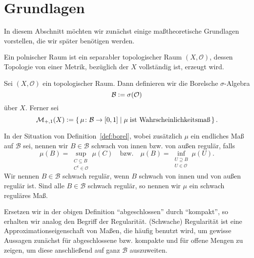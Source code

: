 \documentclass[../main/main.tex]{subfiles}
\begin{document}
	
	\section{Grundlagen}
	\label{Grundlagen}
	
	In diesem Abschnitt möchten wir zunächst einige maßtheoretische Grundlagen vorstellen, 
	die wir später benötigen werden.

	\begin{Definition}
		Ein polnischer Raum ist ein separabler topologischer Raum $(X, \mathcal{O})$, 
		dessen Topologie von einer Metrik, bezüglich der $X$ vollständig ist, erzeugt wird.
	\end{Definition}

	\begin{Definition}
		\label{def:borel}
		Sei $(X, \mathcal{O})$ ein topologischer Raum. Dann definieren wir die Borelsche 
		$\sigma$-Algebra
		$$\mathcal{B} \vcentcolon = \sigma(\mathcal{O})$$
		über $X$. Ferner sei
		$$\mathcal{M}_{+,1}(X) \vcentcolon = \left\{\, \mu \colon \mathcal{B} \to [0,1] \; | \; \mu \; 
			\text{ist Wahrscheinlichkeitsmaß} \,\right\}\text{.}$$
	\end{Definition}

	\begin{Definition}
		\label{def:regularity}
		In der Situation von Definition~\ref{def:borel}, wobei zusätzlich $\mu$ ein 
		endliches Maß auf $\mathcal{B}$ sei, nennen wir $B \in \mathcal{B}$ schwach von 
		innen bzw. von außen regulär, falls
		$$\mu(B) = \sup_{\substack{C \subseteq B \\ C^\mathsf{c} \in \mathcal{O}}} \mu(C) 
		\quad \text{bzw.} \quad \mu(B) = \inf_{\substack{U \supseteq B \\ U \in \mathcal{O}}} 
		\mu(U)\text{.}$$
		Wir nennen $B \in \mathcal{B}$ schwach regulär, wenn $B$ schwach von innen und 
		von außen regulär ist. Sind alle $B \in \mathcal{B}$ schwach regulär, 
		so nennen wir $\mu$ ein schwach reguläres Maß.
	\end{Definition}

	\begin{Bemerkung}
		Ersetzen wir in der obigen Definition \enquote{abgeschlossen} durch \enquote{kompakt}, 
		so erhalten wir analog den Begriff der Regularität. (Schwache) Regularität ist eine 
		Approximationseigenschaft von Maßen, die häufig benutzt wird, um gewisse Aussagen 
		zunächst für abgeschlossene bzw. kompakte und für offene Mengen zu zeigen, um diese 
		anschließend auf ganz $\mathcal{B}$ auszuweiten.
	\end{Bemerkung}
\end{document}
